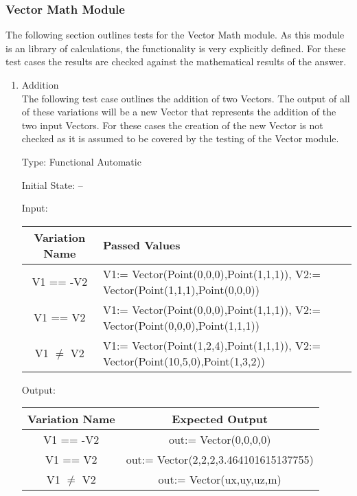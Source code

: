 \documentclass[12pt, titlepage]{article}
\begin{document}
\subsubsection{Vector Math Module}
The following section outlines tests for the Vector Math module. As this module 
is an library of calculations, the functionality is very explicitly defined. 
For these test cases the results are checked against the mathematical results 
of the answer.

\begin{enumerate}
	
	\item{Addition\\}
	The following test case outlines the addition of two Vectors. The output of 
	all of these variations will be a new Vector that represents the addition 
	of the two input Vectors. For these cases the creation of the new Vector is 
	not checked as it is assumed to be covered by the testing of the Vector 
	module.
	
	Type: Functional Automatic
	
	Initial State: --
	
	Input: 
	\begin{tabular}{|c|p{8cm}|}
		\hline
		\textbf{Variation Name} & \textbf{Passed Values}\\
		\hline
		V1 == -V2 & V1:= Vector(Point(0,0,0),Point(1,1,1)), V2:= 
		Vector(Point(1,1,1),Point(0,0,0))\\
		V1 == V2 & V1:= Vector(Point(0,0,0),Point(1,1,1)), V2:= 
		Vector(Point(0,0,0),Point(1,1,1))\\
		V1 $\neq$ V2 & V1:= Vector(Point(1,2,4),Point(1,1,1)), V2:= 
		Vector(Point(10,5,0),Point(1,3,2))\\
		\hline
	\end{tabular}
	
	Output: 
	\begin{tabular}{|c|c|}
		\hline
		\textbf{Variation Name} & \textbf{Expected Output}\\
		\hline
		V1 == -V2 & out:= Vector(0,0,0,0)\\
		V1 == V2 & out:= Vector(2,2,2,3.464101615137755‬)\\
		V1 $\neq$ V2 & out:= Vector(ux,uy,uz,m)\\		
		\hline
	\end{tabular}
	

\end{enumerate}
\end{document}
